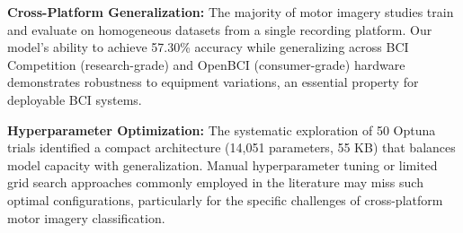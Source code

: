 \textbf{Cross-Platform Generalization:} The majority of motor imagery studies train and evaluate on homogeneous datasets from a single recording platform. Our model's ability to achieve 57.30\% accuracy while generalizing across BCI Competition (research-grade) and OpenBCI (consumer-grade) hardware demonstrates robustness to equipment variations, an essential property for deployable BCI systems.

\textbf{Hyperparameter Optimization:} The systematic exploration of 50 Optuna trials identified a compact architecture (14,051 parameters, 55 KB) that balances model capacity with generalization. Manual hyperparameter tuning or limited grid search approaches commonly employed in the literature may miss such optimal configurations, particularly for the specific challenges of cross-platform motor imagery classification.



